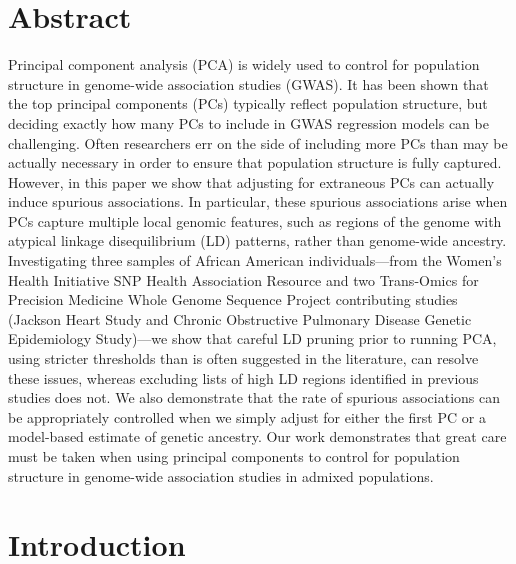 \documentclass[12pt]{article}
\newcommand{\edit}[1]{{\color{red}{#1}}}
\begin{document}
\newpage
\section*{Abstract}


\edit{Current word count: 245 \\Maximum allowed by AJHG: 250}

\noindent Principal component analysis (PCA) is widely used to control for population structure in genome-wide association studies (GWAS). 
It has been shown that the top principal components (PCs) typically reflect population structure, but deciding exactly how many PCs to include in GWAS regression models can be challenging. 
Often researchers err on the side of including more PCs than may be actually necessary in order to ensure that population structure is fully captured. 
However, in this paper we show that adjusting for extraneous PCs can actually induce spurious associations.
In particular, these spurious associations arise when PCs capture multiple local genomic features, such as regions of the genome with atypical linkage disequilibrium (LD) patterns, rather than genome-wide ancestry.
Investigating three samples of African American individuals---from the Women's Health Initiative SNP Health Association Resource and two Trans-Omics for Precision Medicine Whole Genome Sequence Project contributing studies (Jackson Heart Study and Chronic Obstructive Pulmonary Disease Genetic Epidemiology Study)---we show that careful LD pruning prior to running PCA, using stricter thresholds than is often suggested in the literature, can resolve these issues, whereas excluding lists of high LD regions identified in previous studies does not. 
We also demonstrate that the rate of spurious associations can be appropriately controlled when we simply adjust for either the first PC or a model-based estimate of genetic ancestry. 
Our work demonstrates that great care must be taken when using principal components to control for population structure in genome-wide association studies in admixed populations.


\newpage
\section{Introduction}
\end{document}
